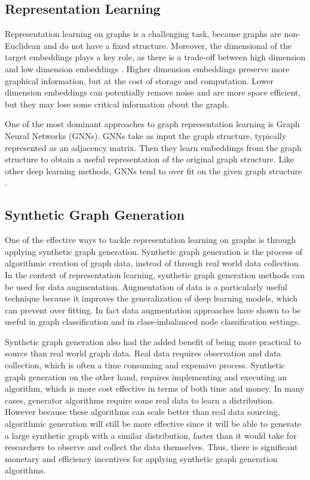\documentclass{article}
\begin{document}
\subsection{Representation Learning}

Representation learning on graphs is a challenging task, because graphs are non-Euclidean and do not have a fixed structure. Moreover, the dimensional of the target embeddings plays a key role, as there is a trade-off between high dimension and low dimension embeddings \cite{DBLP:journals/corr/abs-1909-00958}. Higher dimension embeddings preserve more graphical information, but at the cost of storage and computation. Lower dimension embeddings can potentially remove noise and are more space efficient, but they may lose some critical information about the graph. 

One of the most dominant approaches to graph representation learning is Graph Neural Networks (GNNs). GNNs take as input the graph structure, typically represented as an adjacency matrix. Then they learn embeddings from the graph structure to obtain a useful representation of the original graph structure. Like other deep learning methods, GNNs tend to over fit on the given graph structure \cite{bechlerspeicher2024graph}.

\subsection{Synthetic Graph Generation}

One of the effective ways to tackle representation learning on graphs is through applying synthetic graph generation. Synthetic graph generation is the process of algorithmic creation of graph data, instead of through real world data collection. In the context of representation learning, synthetic graph generation methods can be used for data augmentation. Augmentation of data is a particularly useful technique because it improves the generalization of deep learning models, which can prevent over fitting. In fact data augmentation approaches have shown to be useful in graph classification \cite{gmixup} and in class-imbalanced node classification \cite{graphmixup} settings.  

Synthetic graph generation also had the added benefit of being more practical to source than real world graph data. Real data requires observation and data collection, which is often a time consuming and expensive process. Synthetic graph generation on the other hand, requires implementing and executing an algorithm, which is more cost effective in terms of both time and money. In many cases, generator algorithms require some real data to learn a distribution. However because these algorithms can scale better than real data sourcing, algorithmic generation will still be more effective since it will be able to generate a large synthetic graph with a similar distribution, faster than it would take for researchers to observe and collect the data themselves. Thus, there is significant monetary and efficiency incentives for applying synthetic graph generation algorithms. 
\end{document}
